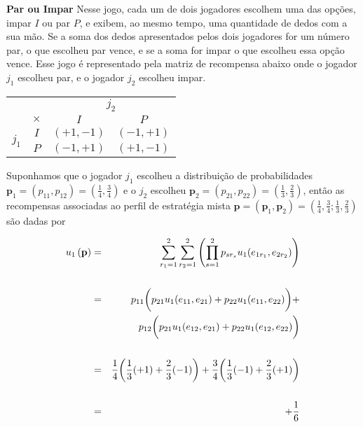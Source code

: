 \begin{ex} \textbf{Par ou Impar} Nesse jogo, cada um de dois jogadores escolhem uma das opções, impar $I$ ou par $P$, e exibem, ao mesmo tempo, uma quantidade de dedos com a sua mão. Se a soma dos dedos apresentados pelos dois jogadores for um número par, o que escolheu par vence, e se a soma for impar o que escolheu essa opção vence. Esse jogo é representado pela matriz de recompensa abaixo onde o jogador $j_1$ escolheu par, e o jogador $j_2$ escolheu impar.

\begin{center}
\begin{tabular}[H]{c|c|c|c|}
\multicolumn{2}{c}{} & \multicolumn{2}{c}{$j_2$} \\\cline{2-4}
& $\times$ & $I$ & $P$\\\cline{2-4}
\multirow{2}{*}{$j_1$} & $I$ & $(+1,-1)$ & $(-1,+1)$ \\\cline{2-4}
& $P$ & $(-1,+1)$ & $(+1,-1)$ \\\cline{2-4}
\end{tabular}
\end{center}\vspace{1cm}

Suponhamos que o jogador $j_1$ escolheu  a distribuição de probabilidades $\textbf{p}_1=\left(p_{11},p_{12}\right)=\left(\tfrac{1}{4},\tfrac{3}{4}\right)$ e o $j_2$ escolheu $\textbf{p}_2=\left(p_{21},p_{22}\right)=\left(\tfrac{1}{3},\tfrac{2}{3}\right)$, então as recompensas associadas ao perfil de estratégia mista $\textbf{p}=\left(\textbf{p}_1,\textbf{p}_2\right)=\left(\tfrac{1}{4},\tfrac{3}{4};\tfrac{1}{3},\tfrac{2}{3}\right)$ são dadas por

\begin{eqnarray}
u_1\left(\textbf{p}\right) & = & \sum_{r_1=1}^{2}\sum_{r_2=1}^{2}\left(\prod_{s=1}^{2}{p_{sr_s}u_1(e_{1r_1},e_{2r_2})}\right)\nonumber\\\nonumber\\
 & = & p_{11}\bigg(p_{21}u_1(e_{11},e_{21})+p_{22}u_1(e_{11},e_{22})\bigg)+\nonumber\\
& & p_{12}\bigg(p_{21}u_1(e_{12},e_{21})+p_{22}u_1(e_{12},e_{22})\bigg)\nonumber\\\nonumber\\
& = & \dfrac{1}{4}\bigg(\dfrac{1}{3}(+1)+\dfrac{2}{3}(-1)\bigg)+\dfrac{3}{4}\bigg(\dfrac{1}{3}(-1)+\dfrac{2}{3}(+1)\bigg)\nonumber\\\nonumber\\
& = & +\dfrac{1}{6}\nonumber\vspace{0.1cm}
\end{eqnarray}


\end{ex}
